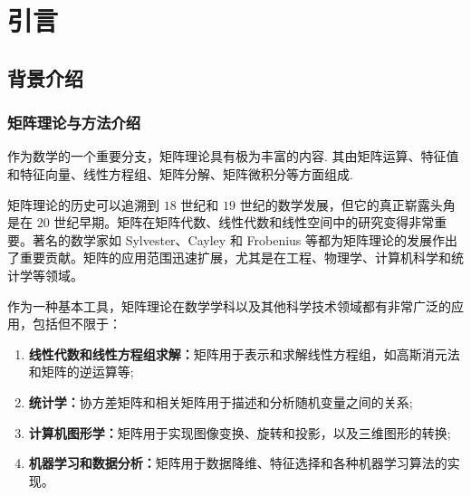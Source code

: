 \section{引言}
\fontsize{12pt}{14pt}\selectfont
\songti
    \subsection{背景介绍}
        \subsubsection{矩阵理论与方法介绍}
            \par 作为数学的一个重要分支，矩阵理论具有极为丰富的内容. 其由矩阵运算、特征值和特征向量、线性方程组、矩阵分解、矩阵微积分等方面组成.
            \par 矩阵理论的历史可以追溯到 $18$ 世纪和 $19$ 世纪的数学发展，但它的真正崭露头角是在 $20$ 世纪早期。矩阵在矩阵代数、线性代数和线性空间中的研究变得非常重要。著名的数学家如 Sylvester、Cayley 和 Frobenius 等都为矩阵理论的发展作出了重要贡献。矩阵的应用范围迅速扩展，尤其是在工程、物理学、计算机科学和统计学等领域。
            \par 作为一种基本工具，矩阵理论在数学学科以及其他科学技术领域都有非常广泛的应用，包括但不限于：
            \begin{enumerate}
                \item \textbf{线性代数和线性方程组求解：}矩阵用于表示和求解线性方程组，如高斯消元法和矩阵的逆运算等;
                \item \textbf{统计学：}协方差矩阵和相关矩阵用于描述和分析随机变量之间的关系;
                \item \textbf{计算机图形学：}矩阵用于实现图像变换、旋转和投影，以及三维图形的转换;
                \item \textbf{机器学习和数据分析：}矩阵用于数据降维、特征选择和各种机器学习算法的实现。
            \end{enumerate}

